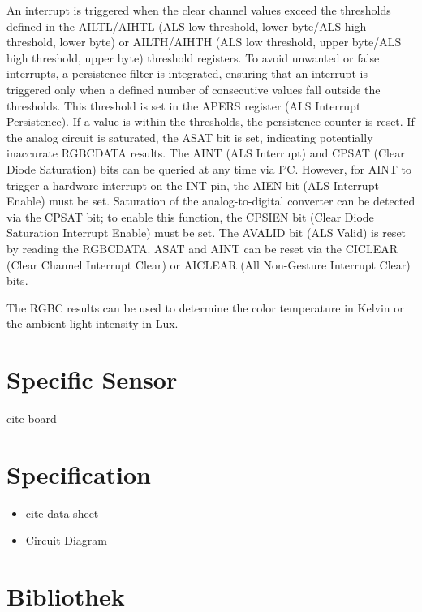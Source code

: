 An interrupt is triggered when the clear channel values exceed the thresholds defined in the AILTL/AIHTL (ALS low threshold, lower byte/ALS high threshold, lower byte) or AILTH/AIHTH (ALS low threshold, upper byte/ALS high threshold, upper byte) threshold registers. To avoid unwanted or false interrupts, a persistence filter is integrated, ensuring that an interrupt is triggered only when a defined number of consecutive values fall outside the thresholds. This threshold is set in the APERS register (ALS Interrupt Persistence). If a value is within the thresholds, the persistence counter is reset. If the analog circuit is saturated, the ASAT bit is set, indicating potentially inaccurate RGBCDATA results. The AINT (ALS Interrupt) and CPSAT (Clear Diode Saturation) bits can be queried at any time via I²C. However, for AINT to trigger a hardware interrupt on the INT pin, the AIEN bit (ALS Interrupt Enable) must be set. Saturation of the analog-to-digital converter can be detected via the CPSAT bit; to enable this function, the CPSIEN bit (Clear Diode Saturation Interrupt Enable) must be set. The AVALID bit (ALS Valid) is reset by reading the RGBCDATA. ASAT and AINT can be reset via the CICLEAR (Clear Channel Interrupt Clear) or AICLEAR (All Non-Gesture Interrupt Clear) bits.

The RGBC results can be used to determine the color temperature in Kelvin or the ambient light intensity in Lux.

\cite{Avago:2015}








\section{Specific Sensor}

cite board

\section{Specification}

\begin{itemize}
  \item cite data sheet
  \item Circuit Diagram
\end{itemize}

\section{Bibliothek}

